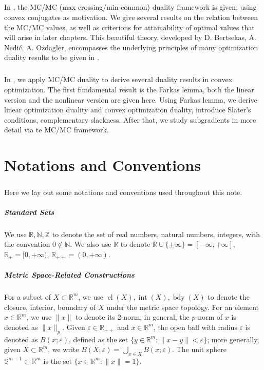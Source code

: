 \paragraph{}In , the MC/MC (max-crossing/min-common) duality framework is given, using convex conjugates as motivation. We give several results on the relation between the MC/MC values, as well as criterions for attainability of optimal values that will arise in later chapters. This beautiful theory, developed by D. Bertsekas, A. Nedi\'{c}, A. Ozdagler, encompasses the underlying principles of many optimization duality results to be given in .

\paragraph{}In , we apply MC/MC duality to derive several duality results in convex optimization. The first fundamental result is the Farkas lemma, both the linear version and the nonlinear version are given here. Using Farkas lemma, we derive linear optimization duality and convex optimization duality, introduce Slater's conditions, complementary slackness. After that, we study subgradients in more detail via te MC/MC framework.

\chapter*{Notations and Conventions}

\paragraph{}Here we lay out some notations and conventions used throughout this note.

\paragraph{Standard Sets}We use $\mathbb{R,N,Z}$ to denote the set of real numbers, natural numbers, integers, with the convention $0\notin \mathbb{N}$. We also use $\overline{\mathbb{R}}$ to denote $\mathbb{R}\cup\{\pm\infty\}=[-\infty,+\infty]$, $\mathbb{R}_{+}=[0,+\infty)$, $\mathbb{R}_{++}=(0,+\infty)$.

\paragraph{Metric Space-Related Constructions}For a subset of $X\subset \mathbb{R}^m$, we use $\operatorname{cl}(X),\operatorname{int}(X),\operatorname{bdy}(X)$ to denote the closure, interior, boundary of $X$ under the metric space topology. For an element $x\in \mathbb{R}^m$, we use $\|x\|$ to denote its $2$-norm; in general, the $p$-norm of $x$ is denoted as $\|x\|_p$. Given $\varepsilon \in \mathbb{R}_{++}$ and $x\in \mathbb{R}^m$, the open ball with radius $\varepsilon$ is denoted as $B(x;\varepsilon )$, defined as the set $\{y\in \mathbb{R}^m:\|x-y\|<\varepsilon \}$; more generally, given $X\subset \mathbb{R}^m$, we write $B(X;\varepsilon )=\bigcup_{x\in X}B(x;\varepsilon )$. The unit sphere $\mathbb{S}^{m-1}\subset \mathbb{R}^m$ is the set $\{x\in \mathbb{R}^m:\|x\|=1\}$.

